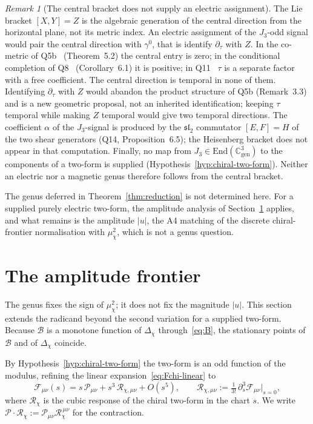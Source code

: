 \documentclass[11pt]{article}
\theoremstyle{definition}
\theoremstyle{remark}
\newtheorem{remark}{Remark}
\newcommand{\Jthree}{J_{3}}
\newcommand{\Fchi}{\mathcal{F}}
\newcommand{\Pchi}{\mathcal{P}}
\newcommand{\Bsat}{\mathcal{B}}
\newcommand{\Dchi}{\Delta_{\chi}}
\newcommand{\Cgen}{\mathbb{C}^{3}_{\mathrm{gen}}}
\newcommand{\muchi}{\mu_{\chi}^{2}}
\begin{document}
    \begin{remark}[The central bracket does not supply an electric assignment]
      \label{rem:bracket}
      The Lie bracket $[X, Y] = Z$ is the algebraic generation of the central direction from the horizontal plane, not
      its metric index.
      An electric assignment of the $\Jthree$-odd signal would pair the central direction with $\gamma^0$, that is
      identify $\partial_\tau$ with $Z$.
      In the co-metric of Q5b~\cite{Beau2026q5b} (Theorem~5.2) the central entry is zero; in the conditional
      completion of Q8~\cite{BeauQ8} (Corollary~6.1) it is positive; in Q11~\cite{Beau2026q11} $\tau$ is a separate
      factor with a free coefficient.
      The central direction is temporal in none of them.
      Identifying $\partial_\tau$ with $Z$ would abandon the product structure of Q5b (Remark~3.3) and is a new
      geometric proposal, not an inherited identification; keeping $\tau$ temporal while making $Z$ temporal would give
      two temporal directions.
      The coefficient $\alpha$ of the $\Jthree$-signal is produced by the $\mathfrak{sl}_2$ commutator $[E,F]=H$ of
      the two shear generators (Q14, Proposition~6.5); the Heisenberg bracket does not appear in that computation.
      Finally, no map from $\Jthree\in\mathrm{End}(\Cgen)$ to the components of a two-form is supplied
      (Hypothesis~\ref{hyp:chiral-two-form}).
      Neither an electric nor a magnetic genus therefore follows from the central bracket.
    \end{remark}

    The genus deferred in Theorem~\ref{thm:reduction} is not determined here.
    For a supplied purely electric two-form, the amplitude analysis of Section~\ref{sec:amplitude} applies, and what
    remains is the amplitude $|u|$, the A4 matching of the discrete chiral-frontier normalisation with $\muchi$, which
    is not a genus question.

  \section{The amplitude frontier}
    \label{sec:amplitude}

    The genus fixes the sign of $\muchi$; it does not fix the magnitude $|u|$.
    This section extends the radicand beyond the second variation for a supplied two-form.
    Because $\Bsat$ is a monotone function of $\Dchi$ through~\eqref{eq:B}, the stationary points of $\Bsat$ and of
    $\Dchi$ coincide.

    By Hypothesis~\ref{hyp:chiral-two-form} the two-form is an odd function of the modulus, refining the linear
    expansion~\eqref{eq:Fchi-linear} to
    \begin{equation}
      \label{eq:Fchi-cubic}
      \Fchi_{\mu\nu}(s) = s\, \Pchi_{\mu\nu} + s^3\, \mathcal{R}_{\chi,\mu\nu} + O(s^5), \qquad
      \mathcal{R}_{\chi,\mu\nu} := \tfrac{1}{3!}\, \partial_s^3 \Fchi_{\mu\nu}\big|_{s=0} ,
    \end{equation}
    where $\mathcal{R}_{\chi}$ is the cubic response of the chiral two-form in the chart $s$.
    We write $\Pchi \cdot \mathcal{R}_{\chi} := \Pchi_{\mu\nu} \mathcal{R}_{\chi}^{\,\mu\nu}$ for the contraction.
\end{document}
